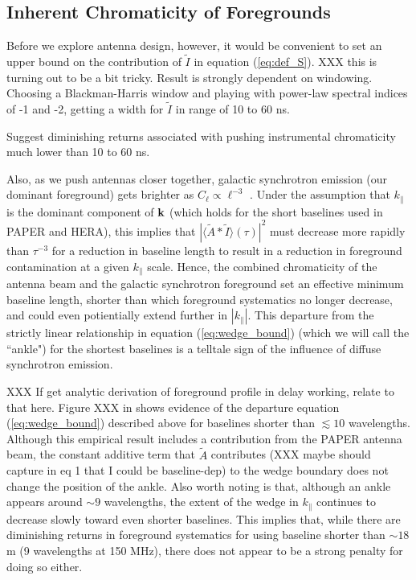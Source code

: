 \documentclass[11pt]{article}
\newcommand{\kvec}{{\bf k}}
\newcommand{\kpl}{{k_\parallel}}
\newcommand{\AI}{{\langle\tilde A*\tilde I\rangle}}
\newcommand{\AItau}{{\AI(\tau)}}
\begin{document}
\subsection{Inherent Chromaticity of Foregrounds}

Before we explore antenna design, however, it would be convenient to set an upper bound on the contribution of
$\tilde I$ in equation (\ref{eq:def_S}).  XXX this is turning out to be a bit tricky.  Result is strongly
dependent on windowing.  Choosing a Blackman-Harris window and playing with power-law spectral indices of
-1 and -2, getting a width for $\tilde I$ in range of 10 to 60 ns.

Suggest diminishing returns associated with pushing instrumental chromaticity much lower than 10 to 60 ns.

Also, as we push antennas closer together, galactic synchrotron emission (our dominant foreground) gets
brighter as $C_\ell\propto\ell^{-3}$ \citep{}.
Under the assumption that $\kpl$ is the dominant component of $\kvec$ (which
holds for the short baselines used in PAPER and HERA),
this implies that $|\AItau|^2$ must decrease more rapidly than $\tau^{-3}$ for a reduction in baseline length
to result in a reduction in foreground contamination at a given $\kpl$ scale.  Hence, the combined chromaticity
of the antenna beam and the galactic synchrotron foreground set an effective minimum baseline length, shorter
than which foreground systematics no longer decrease, and could even potientially extend further in $|\kpl|$.  
This departure from the
strictly linear relationship in equation (\ref{eq:wedge_bound}) (which we will call the ``ankle")
for the shortest baselines is a telltale sign
of the influence of diffuse synchrotron emission.

XXX If get analytic derivation of foreground profile in delay working, relate to that here.
Figure XXX in \citet{2013ApJ...768L..36P}
shows evidence of the departure equation (\ref{eq:wedge_bound}) described above for baselines shorter than
$\lesssim10$ wavelengths.  Although this empirical result includes a contribution from the PAPER antenna beam,
the constant additive term that $\tilde A$ contributes (XXX maybe should capture in eq 1 that I could be baseline-dep)
to the wedge boundary does not change the position of the ankle.  Also worth noting is that, although an ankle
appears around $\sim9$ wavelengths, the extent of the wedge in $\kpl$ continues to decrease slowly toward 
even shorter baselines.  This implies that, while there are diminishing returns in foreground systematics for using
baseline shorter than $\sim18$ m (9 wavelengths at 150 MHz), there does not appear to be a strong penalty 
for doing so either.
\end{document}
